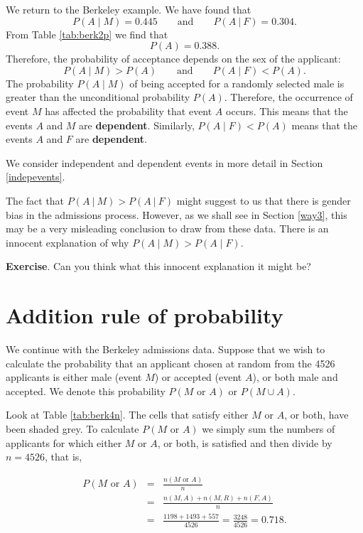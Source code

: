 \documentclass[
  11pt,
  british,
  openany, a4paper]{book}
\begin{document}
We return to the Berkeley example. We have found that
\[ P(A \mid M) = 0.445 \qquad \mbox{and} \qquad P(A~|~F) = 0.304. \]
From Table \ref{tab:berk2p} we find that
\[ P(A) = 0.388. \]
Therefore, the probability of acceptance depends on the sex of the applicant:
\[ P(A \mid M) > P(A) \qquad \mbox{and} \qquad P(A \mid F) < P(A). \]
The probability \(P(A \mid M)\) of being accepted for a randomly selected male is greater than the unconditional probability \(P(A)\). Therefore, the occurrence of event \(M\) has affected the probability that event \(A\) occurs. This means that the events \(A\) and \(M\) are \textbf{dependent}. Similarly, \(P(A \mid F) < P(A)\) means that the events \(A\) and \(F\) are \textbf{dependent}.

We consider independent and dependent events in more detail in Section \ref{indepevents}.

The fact that \(P(A~|~M) > P(A~|~F)\) might suggest to us that there is gender bias in the admissions process. However, as we shall see in Section \ref{way3}, this may be a very misleading conclusion to draw from these data. There is an innocent explanation of why \(P(A \mid M) > P(A \mid F)\).

\textbf{Exercise}. Can you think what this innocent explanation it might be?

\hypertarget{addition-rule-of-probability}{%
\section{Addition rule of probability}\label{addition-rule-of-probability}}

We continue with the Berkeley admissions data. Suppose that we wish to calculate the probability that an applicant chosen at random from the 4526 applicants is either male (event \(M\)) or accepted (event \(A\)), or both male and accepted. We denote this probability \(P(M \mbox{ or } A)\) or \(P(M \cup A)\).

Look at Table \ref{tab:berk4n}. The cells that satisfy either \(M\) or \(A\), or both, have been shaded grey. To calculate \(P(M \mbox{ or } A)\) we simply sum the numbers of applicants for which either \(M\) or \(A\), or both, is satisfied and then divide by \(n=4526\), that is,

\begin{eqnarray*}
P(M \mbox{ or } A) &=& \frac{n(M \mbox{ or } A)}{n} \\
          &=& \frac{n(M , A)+n(M , R)+n(F , A)}{n} \\
          &=& \frac{1198+1493+557}{4526} = \frac{3248}{4526} = 0.718. 
\end{eqnarray*}
\end{document}

